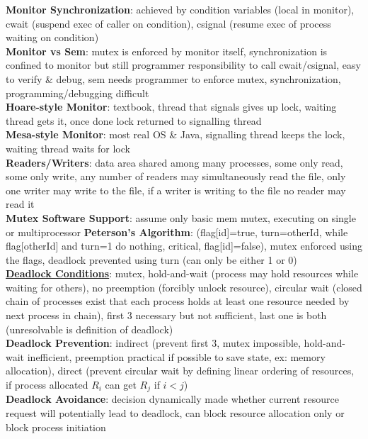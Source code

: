 \documentclass[a4paper]{article}
\begin{document}
\begin{multicols}{2}
        \textbf{Monitor Synchronization}: achieved by condition variables (local in monitor), cwait (suspend exec of caller on condition), csignal (resume exec of process waiting on condition)\\
        \textbf{Monitor vs Sem}: mutex is enforced by monitor itself, synchronization is confined to monitor but still programmer responsibility to call cwait/csignal, easy to verify \& debug, sem needs programmer to enforce mutex, synchronization, programming/debugging difficult\\
        \textbf{Hoare-style Monitor}: textbook, thread that signals gives up lock, waiting thread gets it, once done lock returned to signalling thread\\
        \textbf{Mesa-style Monitor}: most real OS \& Java, signalling thread keeps the lock, waiting thread waits for lock\\
        \textbf{Readers/Writers}: data area shared among many processes, some only read, some only write, any number of readers may simultaneously read the file, only one writer may write to the file, if a writer is writing to the file no reader may read it\\
        \textbf{Mutex Software Support}: assume only basic mem mutex, executing on single or multiprocessor
        \textbf{Peterson's Algorithm}: (flag[id]=true, turn=otherId, while flag[otherId] and turn=1 do nothing, critical, flag[id]=false), mutex enforced using the flags, deadlock prevented using turn (can only be either 1 or 0)\\
        \underline{\textbf{Deadlock Conditions}}: mutex, hold-and-wait (process may hold resources while waiting for others), no preemption (forcibly unlock resource), circular wait (closed chain of processes exist that each process holds at least one resource needed by next process in chain), first 3 necessary but not sufficient, last one is both (unresolvable is definition of deadlock)\\
        \textbf{Deadlock Prevention}: indirect (prevent first 3, mutex impossible, hold-and-wait inefficient, preemption practical if possible to save state, ex: memory allocation), direct (prevent circular wait by defining linear ordering of resources, if process allocated $R_i$ can get $R_j$ if $i < j$)\\
        \textbf{Deadlock Avoidance}: decision dynamically made whether current resource request will potentially lead to deadlock, can block resource allocation only or block process initiation\\

\end{multicols}
\end{document}
